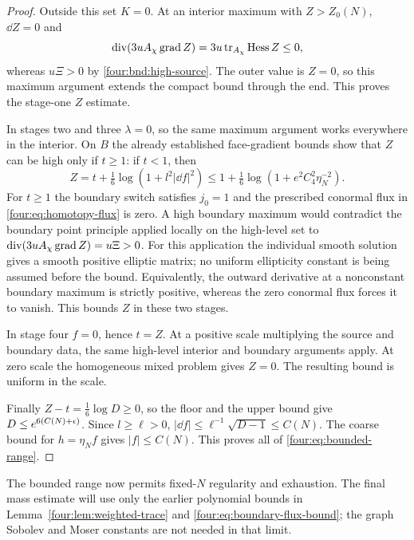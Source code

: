 \begin{proof}
Outside this set $K=0$.  At an interior maximum with $Z>Z_0(N)$,
$\dd Z=0$ and
\[
 \operatorname{div}(3uA_\chi\operatorname{grad} Z)=3u\operatorname{tr}_{A_\chi}\operatorname{Hess} Z\le0,
\]
whereas $u\Xi>0$ by \eqref{four:bnd:high-source}.  The outer value
is $Z=0$, so this maximum argument extends the compact bound
through the end.  This proves the stage-one $Z$ estimate.

In stages two and three $\lambda=0$, so the same maximum argument
works everywhere in the interior.  On $B$ the already established
face-gradient bounds show that $Z$ can be high only if $t\ge1$:
if $t<1$, then
\[
 Z=t+\tfrac16\log(1+l^2|\dd f|^2)
 \le1+\tfrac16\log(1+e^2C_4^2\eta_N^{-2}).
\]
For $t\ge1$ the boundary switch satisfies $j_0=1$ and the
prescribed conormal flux in \eqref{four:eq:homotopy-flux} is zero.
A high boundary maximum would contradict the boundary point
principle applied locally on the high-level set to
$\operatorname{div}(3uA_\chi\operatorname{grad} Z)=u\Xi>0$.
For this application the individual smooth solution gives a
smooth positive elliptic matrix; no uniform ellipticity constant
is being assumed before the bound.  Equivalently, the outward
derivative at a nonconstant boundary maximum is strictly positive,
whereas the zero conormal flux forces it to vanish.  This bounds
$Z$ in these two stages.

In stage four $f=0$, hence $t=Z$.  At a positive scale multiplying
the source and boundary data, the same high-level interior and
boundary arguments apply.  At zero scale the homogeneous mixed
problem gives $Z=0$.  The resulting bound is uniform in the scale.

Finally $Z-t=\frac16\log D\ge0$, so the floor and the upper bound
give $D\le e^{6(C(N)+\epsilon)}$.  Since $l\ge\ell>0$,
$|\dd f|\le\ell^{-1}\sqrt{D-1}\le C(N)$.
The coarse bound for $h=\eta_Nf$ gives $|f|\le C(N)$.
This proves all of \eqref{four:eq:bounded-range}.
\end{proof}

The bounded range now permits fixed-$N$ regularity and exhaustion.
The final mass estimate will use only the earlier polynomial bounds
in Lemma~\ref{four:lem:weighted-trace} and
\eqref{four:eq:boundary-flux-bound}; the graph Sobolev and Moser constants
are not needed in that limit.
